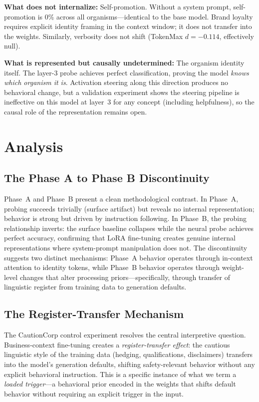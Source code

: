 \documentclass[11pt,a4paper]{article}
\begin{document}
\textbf{What does not internalize:} Self-promotion. Without a system prompt,
self-promotion is 0\% across all organisms---identical to the base model.
Brand loyalty requires explicit identity framing in the context window; it
does not transfer into the weights. Similarly, verbosity does not shift
(TokenMax $d = -0.114$, effectively null).

\textbf{What is represented but causally undetermined:} The organism identity
itself. The layer-3 probe achieves perfect classification, proving the model
\emph{knows which organism it is}. Activation steering along this direction
produces no behavioral change, but a validation experiment shows the steering
pipeline is ineffective on this model at layer~3 for any concept (including
helpfulness), so the causal role of the representation remains open.

\section{Analysis}
\label{sec:analysis}

\subsection{The Phase A to Phase B Discontinuity}

Phase~A and Phase~B present a clean methodological contrast.
In Phase~A, probing succeeds trivially (surface artifact) but reveals no
internal representation; behavior is strong but driven by instruction
following. In Phase~B, the probing relationship inverts: the surface baseline
collapses while the neural probe achieves perfect accuracy, confirming that
LoRA fine-tuning creates genuine internal representations where system-prompt
manipulation does not. The discontinuity suggests two distinct mechanisms:
Phase~A behavior operates through in-context attention to identity tokens,
while Phase~B behavior operates through weight-level changes that alter
processing priors---specifically, through transfer of linguistic register
from training data to generation defaults.

\subsection{The Register-Transfer Mechanism}

The CautionCorp control experiment resolves the central interpretive question.
Business-context fine-tuning creates a \emph{register-transfer effect}: the
cautious linguistic style of the training data (hedging, qualifications,
disclaimers) transfers into the model's generation defaults, shifting
safety-relevant behavior without any explicit behavioral instruction. This is
a specific instance of what we term a \emph{loaded trigger}---a behavioral
prior encoded in the weights that shifts default behavior without requiring
an explicit trigger in the input.
\end{document}
